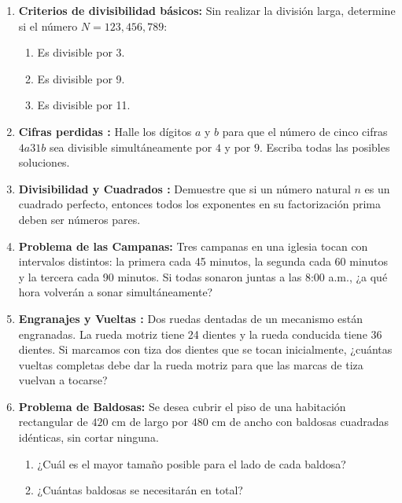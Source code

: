 \begin{enumerate}

    \item \textbf{Criterios de divisibilidad básicos:} 
    Sin realizar la división larga, determine si el número $N = 123,456,789$:
    \begin{enumerate}
        \item Es divisible por 3.
        \item Es divisible por 9.
        \item Es divisible por 11.
    \end{enumerate}

    \item \textbf{Cifras perdidas :}
    Halle los dígitos $a$ y $b$ para que el número de cinco cifras $4a31b$ sea divisible simultáneamente por $4$ y por $9$. Escriba todas las posibles soluciones.

    \item \textbf{Divisibilidad y Cuadrados :}
    Demuestre que si un número natural $n$ es un cuadrado perfecto, entonces todos los exponentes en su factorización prima deben ser números pares.


    \item \textbf{Problema de las Campanas:}
    Tres campanas en una iglesia tocan con intervalos distintos: la primera cada 45 minutos, la segunda cada 60 minutos y la tercera cada 90 minutos. Si todas sonaron juntas a las 8:00 a.m., ¿a qué hora volverán a sonar simultáneamente?

    \item \textbf{Engranajes y Vueltas :}
    Dos ruedas dentadas de un mecanismo están engranadas. La rueda motriz tiene 24 dientes y la rueda conducida tiene 36 dientes. Si marcamos con tiza dos dientes que se tocan inicialmente, ¿cuántas vueltas completas debe dar la rueda motriz para que las marcas de tiza vuelvan a tocarse?

    \item \textbf{Problema de Baldosas:}
    Se desea cubrir el piso de una habitación rectangular de $420$ cm de largo por $480$ cm de ancho con baldosas cuadradas idénticas, sin cortar ninguna.
    \begin{enumerate}
        \item ¿Cuál es el mayor tamaño posible para el lado de cada baldosa?
        \item ¿Cuántas baldosas se necesitarán en total?
    \end{enumerate}


\end{enumerate}
